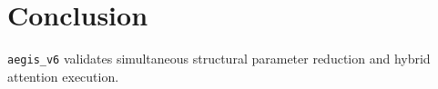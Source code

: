 \section{Conclusion}\texttt{aegis\_v6} validates simultaneous structural parameter reduction and hybrid attention execution.

